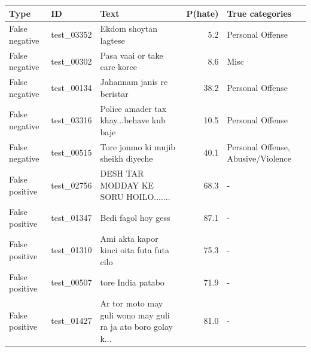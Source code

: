 \begin{tabular}{lllrl}
\toprule
Type & ID & Text & P(hate) & True categories \\
\midrule
False negative & test\_03352 & Ekdom shoytan lagtese & 5.2 & Personal Offense \\
False negative & test\_00302 & Pasa vaai or take care korce & 8.6 & Misc \\
False negative & test\_00134 & Jahannam janis re beristar & 38.2 & Personal Offense \\
False negative & test\_03316 & Police amader tax khay...behave kub baje & 10.5 & Personal Offense \\
False negative & test\_00515 & Tore jonmo ki mujib sheikh diyeche & 40.1 & Personal Offense, Abusive/Violence \\
False positive & test\_02756 & DESH TAR MODDAY KE SORU HOILO....... & 68.3 & - \\
False positive & test\_01347 & Bedi fagol hoy gess & 87.1 & - \\
False positive & test\_01310 & Ami akta kapor kinci oita futa futa cilo & 75.3 & - \\
False positive & test\_00507 & tore India patabo & 71.9 & - \\
False positive & test\_01427 & Ar tor moto may guli wono may guli ra ja ato boro golay k... & 81.0 & - \\
\bottomrule
\end{tabular}
